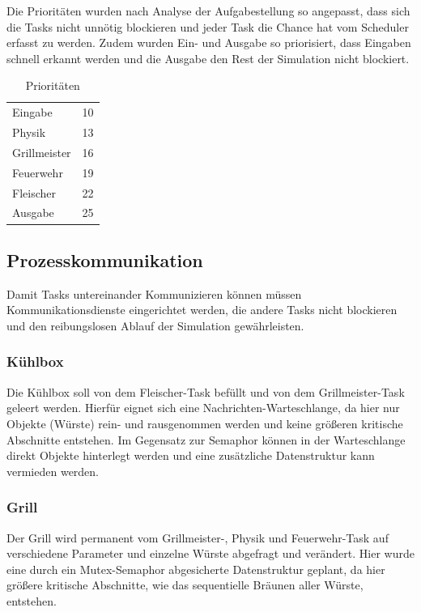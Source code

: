 Die Prioritäten wurden nach Analyse der Aufgabestellung so angepasst, dass sich die Tasks nicht unnötig blockieren und jeder Task die Chance hat vom Scheduler erfasst zu werden.
Zudem wurden Ein- und Ausgabe so priorisiert, dass Eingaben schnell erkannt werden und die Ausgabe den Rest der Simulation nicht blockiert.

\begin{table}[]
\centering
\caption{Prioritäten}
\label{bla}
\begin{tabular}{ll}
Eingabe      & 10 \\
Physik       & 13 \\
Grillmeister & 16 \\
Feuerwehr    & 19 \\
Fleischer    & 22 \\
Ausgabe      & 25
\end{tabular}
\end{table}

\subsection{Prozesskommunikation}

Damit Tasks untereinander Kommunizieren können müssen Kommunikationsdienste eingerichtet werden, die andere Tasks nicht blockieren und den reibungslosen Ablauf der Simulation gewährleisten.

\subsubsection{Kühlbox}

Die Kühlbox soll von dem Fleischer-Task befüllt und von dem Grillmeister-Task geleert werden.
Hierfür eignet sich eine Nachrichten-Warteschlange, da hier nur Objekte (Würste) rein- und rausgenommen werden
und keine größeren kritische Abschnitte entstehen.
Im Gegensatz zur Semaphor können in der Warteschlange direkt Objekte hinterlegt werden und eine zusätzliche Datenstruktur kann vermieden werden.

\subsubsection{Grill}

Der Grill wird permanent vom Grillmeister-, Physik und Feuerwehr-Task auf verschiedene Parameter und einzelne Würste abgefragt und verändert.
Hier wurde eine durch ein Mutex-Semaphor abgesicherte Datenstruktur geplant, da hier größere kritische Abschnitte,
wie das sequentielle Bräunen aller Würste, entstehen.

